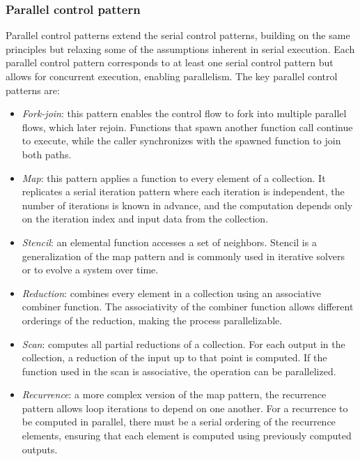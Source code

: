 \subsubsection{Parallel control pattern}
Parallel control patterns extend the serial control patterns, building on the same principles but relaxing some of the assumptions inherent in serial execution. 
Each parallel control pattern corresponds to at least one serial control pattern but allows for concurrent execution, enabling parallelism.
The key parallel control patterns are:
\begin{itemize}
    \item \textit{Fork-join}: this pattern enables the control flow to fork into multiple parallel flows, which later rejoin. 
        Functions that spawn another function call continue to execute, while the caller synchronizes with the spawned function to join both paths. 
    \item \textit{Map}: this pattern applies a function to every element of a collection. 
        It replicates a serial iteration pattern where each iteration is independent, the number of iterations is known in advance, and the computation depends only on the iteration index and input data from the collection. 
    \item \textit{Stencil}: an elemental function accesses a set of neighbors.
        Stencil is a generalization of the map pattern and is commonly used in iterative solvers or to evolve a system over time. 
    \item \textit{Reduction}: combines every element in a collection using an associative combiner function.
        The associativity of the combiner function allows different orderings of the reduction, making the process parallelizable. 
    \item \textit{Scan}: computes all partial reductions of a collection. 
        For each output in the collection, a reduction of the input up to that point is computed. 
        If the function used in the scan is associative, the operation can be parallelized. 
    \item \textit{Recurrence}: a more complex version of the map pattern, the recurrence pattern allows loop iterations to depend on one another. 
        For a recurrence to be computed in parallel, there must be a serial ordering of the recurrence elements, ensuring that each element is computed using previously computed outputs.
\end{itemize}

